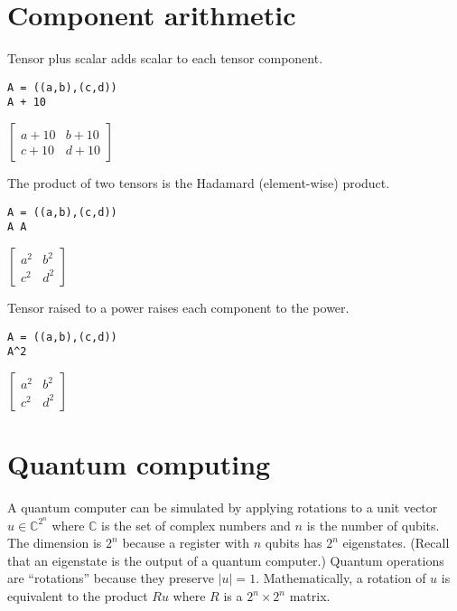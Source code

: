 \documentclass[12pt]{article}
\begin{document}
\fi

\newpage

\section{Component arithmetic}

Tensor plus scalar adds scalar to each tensor component.

{\color{blue}
\begin{verbatim}
A = ((a,b),(c,d))
A + 10
\end{verbatim}}

$\displaystyle
\begin{bmatrix}
a+10 & b+10
\\[1ex]
c+10 & d+10
\end{bmatrix}
$

\bigskip
The product of two tensors is the Hadamard (element-wise) product.

{\color{blue}
\begin{verbatim}
A = ((a,b),(c,d))
A A
\end{verbatim}}

$\displaystyle
\begin{bmatrix}
a^2 & b^2
\\[1ex]
c^2 & d^2
\end{bmatrix}
$

\bigskip

Tensor raised to a power raises each component to the power.

{\color{blue}
\begin{verbatim}
A = ((a,b),(c,d))
A^2
\end{verbatim}}

$\displaystyle
\begin{bmatrix}
a^2 & b^2
\\[1ex]
c^2 & d^2
\end{bmatrix}
$

\newpage

\section{Quantum computing}

A quantum computer can be simulated by applying rotations to a
unit vector
$u\in\mathbb{C}^{2^n}$ where $\mathbb{C}$ is the set of complex numbers
and $n$ is the number of qubits.
The dimension is $2^n$ because a register with $n$ qubits
has $2^n$ eigenstates.
(Recall that an eigenstate is the output of a quantum computer.)
Quantum operations are ``rotations'' because they preserve $|u|=1$.
Mathematically, a rotation of $u$ is equivalent to the product $Ru$
where $R$ is a $2^n\times2^n$ matrix.
\end{document}
